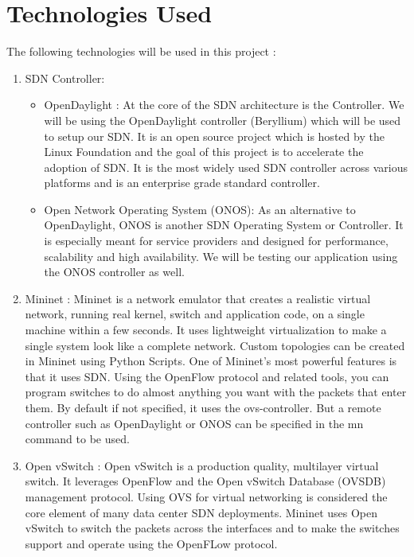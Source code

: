 \documentclass[12pt,a4paper,final]{report}
\begin{document}
\section{Technologies Used}
The following technologies will be used in this project :
\begin{enumerate}
\item
SDN Controller:
\begin{itemize}
\item
OpenDaylight :
\newline
At the core of the SDN architecture is the Controller. We will be using the OpenDaylight controller (Beryllium) which will be used to setup our SDN. It is an open source project which is hosted by the Linux Foundation and the goal of this project is to accelerate the adoption of SDN. It is the most widely used SDN controller across various platforms and is an enterprise grade standard controller.

\item
Open Network Operating System (ONOS):
\newline
As an alternative to OpenDaylight, ONOS is another SDN Operating System or Controller. It is especially meant for service providers and designed for performance, scalability and high availability. We will be testing our application using the ONOS controller as well.
\end{itemize}

\item
Mininet :
\newline
Mininet is a network emulator that creates a realistic virtual network, running real kernel, switch and application code, on a single machine within a few seconds. It uses lightweight virtualization to make a single system look like a complete network. Custom topologies can be created in Mininet using Python Scripts. One of Mininet's most powerful features is that it uses SDN. Using the OpenFlow protocol and related tools, you can program switches to do almost anything you want with the packets that enter them. By default if not specified, it uses the ovs-controller. But a remote controller such as OpenDaylight or ONOS can be specified in the mn command to be used.

\item
Open vSwitch :
\newline
Open vSwitch is a production quality, multilayer virtual switch. It leverages OpenFlow and the Open vSwitch Database (OVSDB) management protocol. Using OVS for virtual networking is considered the core element of many data center SDN deployments. Mininet uses Open vSwitch to switch the packets across the interfaces and to make the switches support and operate using the OpenFLow protocol.


\end{enumerate}
\end{document}
